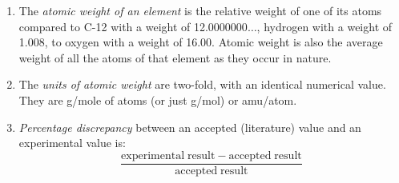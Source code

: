 \documentclass[
	letterpaper, %
	11pt, %
]{CSUniSchoolLabReport}
\begin{document}
\begin{enumerate}
	\item The \textit{atomic weight of an element} is the relative weight of one of its atoms compared to C-12 with a weight of 12.0000000$\ldots$, hydrogen with a weight of 1.008, to oxygen with a weight of 16.00. Atomic weight is also the average weight of all the atoms of that element as they occur in nature.
	\item The \textit{units of atomic weight} are two-fold, with an identical numerical value. They are g/mole of atoms (or just g/mol) or amu/atom.
	\item \textit{Percentage discrepancy} between an accepted (literature) value and an experimental value is:
		\begin{equation*}
			\frac{\mathrm{experimental\;result} - \mathrm{accepted\;result}}{\mathrm{accepted\;result}}
		\end{equation*}
\end{enumerate}


\printbibliography %

\end{document}
